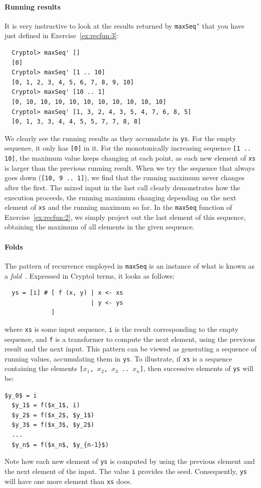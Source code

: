 \paragraph*{Running results} It is very instructive to look at the
results returned by {\tt maxSeq'} that you have just defined in
Exercise~\ref{ex:recfun:3}:
\begin{Verbatim}
  Cryptol> maxSeq' []
  [0]
  Cryptol> maxSeq' [1 .. 10]
  [0, 1, 2, 3, 4, 5, 6, 7, 8, 9, 10]
  Cryptol> maxSeq' [10 .. 1]
  [0, 10, 10, 10, 10, 10, 10, 10, 10, 10, 10]
  Cryptol> maxSeq' [1, 3, 2, 4, 3, 5, 4, 7, 6, 8, 5]
  [0, 1, 3, 3, 4, 4, 5, 5, 7, 7, 8, 8]
\end{Verbatim}
We clearly see the running results as they accumulate in {\tt ys}. For
the empty sequence, it only has {\tt [0]} in it. For the monotonically
increasing sequence {\tt \Verb+[1 .. 10]+}, the maximum value keeps
changing at each point, as each new element of {\tt xs} is larger than
the previous running result. When we try the sequence that always goes
down ({\tt [10, 9 .. 1]}), we find that the running maximum never
changes after the first. The mixed input in the last call clearly
demonstrates how the execution proceeds, the running maximum changing
depending on the next element of {\tt xs} and the running maximum so
far. In the {\tt maxSeq} function of Exercise~\ref{ex:recfun:2}, we
simply project out the last element of this sequence, obtaining the
maximum of all elements in the given sequence.

\paragraph*{Folds}\label{par:fold}\indFold The pattern of recurrence
employed in {\tt maxSeq} is an instance of what is known as a {\em
  fold}~\cite{Bir98}.  Expressed in Cryptol terms, it looks as
follows:
\begin{Verbatim}
  ys = [i] # [ f (x, y) | x <- xs
                        | y <- ys
             ]
\end{Verbatim}
where {\tt xs} is some input sequence, {\tt i} is the result
corresponding to the empty sequence, and {\tt f} is a transformer to
compute the next element, using the previous result and the next
input.  This pattern can be viewed as generating a sequence of running
values, accumulating them in {\tt ys}. To illustrate, if {\tt xs} is a
sequence containing the elements {\tt [$x_1$, $x_2$, $x_3$ .. $x_n$]},
then successive elements of {\tt ys} will be:
\begin{Verbatim}[commandchars=\\\{\}, codes={\catcode`$=3\catcode`^=7\catcode`_=8}]
  $y_0$ = i
  $y_1$ = f($x_1$, i)
  $y_2$ = f($x_2$, $y_1$)
  $y_3$ = f($x_3$, $y_2$)
  ...
  $y_n$ = f($x_n$, $y_{n-1}$)
\end{Verbatim}
Note how each new element of {\tt ys} is computed by using the
previous element and the next element of the input. The value {\tt i}
provides the seed. Consequently, {\tt ys} will have one more element
than {\tt xs} does.


